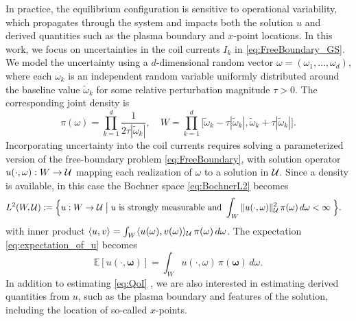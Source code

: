 In practice, the equilibrium configuration is sensitive to operational variability, which propagates through the system and 
impacts both the solution $u$ and derived quantities such as the plasma boundary and $x$-point locations. 
In this work, we focus on uncertainties in the coil currents $I_k$ in \eqref{eq:FreeBoundary_GS}.
We model the uncertainty using a $d$-dimensional random vector $\omega= (\omega_1, \ldots, \omega_d)$, 
where each $\omega_k$ is an independent random variable uniformly distributed around the baseline value 
$\widetilde{\omega}_k$ for some relative perturbation magnitude $\tau > 0$. The corresponding joint density is
%
\[
\pi \left(\omega\right)=\prod_{k=1}^{d} \frac{1}{2\tau |\widetilde{\omega}_k|},\quad 
W=\prod_{k=1}^{d}\Big[ \widetilde{\omega}_k-\tau  | \widetilde{\omega}_k | ,\widetilde{\omega}_k+\tau  | \widetilde{\omega}_k  | \Big].
\]
%
Incorporating uncertainty into the coil currents requires solving a parameterized version of the free-boundary problem \eqref{eq:FreeBoundary}, 
with solution operator $u(\cdot,\omega) : W \to \mathcal{U}$ mapping each realization of $\omega$ to a solution in $\mathcal{U}$. 
Since a density is available, in this case the Bochner space  \eqref{eq:BochnerL2} becomes
\begin{align*}     
  L^2(W, \mathcal{U}) := \Big\{ u: W \rightarrow \mathcal{U} \;\big|\; & 
                                    u \mbox{ is strongly measurable and } 
                                       \int_W \| u(\cdot,\omega) \|_{\mathcal{U}}^2 \, \pi(\omega) \, d\omega < \infty \; \Big\}.
\end{align*}
with inner product $ \langle u, v \rangle =  \int_W  \langle  u(\omega) , v(\omega)  \rangle_{\mathcal{U}} \, \pi(\omega) \, d\omega$.
The expectation   \eqref{eq:expectation_of_u} becomes
 \begin{equation}  \label{eq:QoI}
      \mathbb{E}\left[u(\cdot,\boldsymbol \omega)\right]=\int_W u(\cdot,\omega) \, \pi(\boldsymbol\omega) \,d\omega.
 \end{equation}
 In addition to estimating  \eqref{eq:QoI} , we are also interested in estimating derived quantities from $u$, such as the plasma boundary 
 and features of the solution, including the location of so-called  $x$-points.



